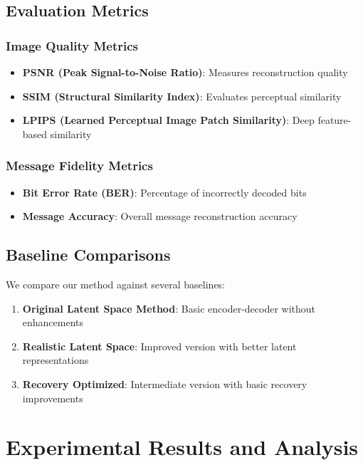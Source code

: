 \documentclass[12pt,a4paper]{report}
\begin{document}
\section{Evaluation Metrics}

\subsection{Image Quality Metrics}

\begin{itemize}
    \item \textbf{PSNR (Peak Signal-to-Noise Ratio)}: Measures reconstruction quality
    \item \textbf{SSIM (Structural Similarity Index)}: Evaluates perceptual similarity
    \item \textbf{LPIPS (Learned Perceptual Image Patch Similarity)}: Deep feature-based similarity
\end{itemize}

\subsection{Message Fidelity Metrics}

\begin{itemize}
    \item \textbf{Bit Error Rate (BER)}: Percentage of incorrectly decoded bits
    \item \textbf{Message Accuracy}: Overall message reconstruction accuracy
\end{itemize}

\section{Baseline Comparisons}

We compare our method against several baselines:

\begin{enumerate}
    \item \textbf{Original Latent Space Method}: Basic encoder-decoder without enhancements
    \item \textbf{Realistic Latent Space}: Improved version with better latent representations
    \item \textbf{Recovery Optimized}: Intermediate version with basic recovery improvements
\end{enumerate}

\chapter{Experimental Results and Analysis}
\label{ch:results}
\end{document}
